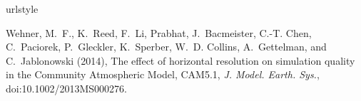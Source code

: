 \documentclass[draft,ms]{agutexSI}
\begin{document}
\begin{article}
%
%


%
\begin{thebibliography}{1}
\providecommand{\natexlab}[1]{#1}
\expandafter\ifx\csname urlstyle\endcsname\relax
  \providecommand{\doi}[1]{doi:\discretionary{}{}{}#1}\else
  \providecommand{\doi}{doi:\discretionary{}{}{}\begingroup
  \urlstyle{rm}\Url}\fi
  
Wehner, M.~F., K.~Reed, F.~Li, Prabhat, J.~Bacmeister, C.-T. Chen, C.~Paciorek,
  P.~Gleckler, K.~Sperber, W.~D. Collins, A.~Gettelman, and C.~Jablonowski
  (2014), {The effect of horizontal resolution on simulation quality in the
  Community Atmospheric Model, CAM5.1}, \textit{J. Model. Earth. Sys.},
  \doi{10.1002/2013MS000276}.
  
\end{thebibliography}
%
%
\end{article}
\clearpage
\end{document}
